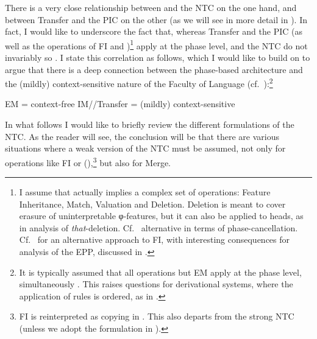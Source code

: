 \documentclass[output=paper]{langsci/langscibook}
\begin{document}
There is a very close relationship between  and the \gls{NTC} on the one hand, and between Transfer and the \gls{PIC} on
the other (as we will see in more detail in ). In fact, I would
like to underscore the fact that, whereas Transfer and the \gls{PIC} (as well
as the operations of \gls{FI} and )\footnote{I assume that
     actually implies a complex set of operations: Feature
    Inheritance, Match, Valuation and Deletion. Deletion is meant to cover
    erasure of uninterpretable φ-features, but it can also be applied to heads,
    as in  analysis of \emph{that}-deletion.
    Cf.~\citet{EKS2016} alternative in terms of phase-cancellation.
Cf.~\citet{Gallego2014} for an alternative approach to \gls{FI}, with
interesting consequences for   analysis of the
\gls{EPP}, discussed in
\citet{Gallego2017}.} apply at the phase level,  and the
\gls{NTC} do not invariably so
\parencites[17]{Chomsky2007}[143]{Chomsky2008}[40, 42]{Chomsky2013}. I state
this correlation as follows, which I would like to build on to argue that there
is a deep connection between the phase-based architecture and the (mildly)
context-sensitive nature of the Faculty of Language
(cf.~\citealt{Chomsky1956,Uriagereka2008}):\footnote{It is typically assumed
    that all operations but \gls{EM} apply at the phase
    level, simultaneously
    \parencites[116]{Chomsky2004}[19]{Chomsky2005}[17]{Chomsky2007}[155]{Chomsky2008}.
This raises questions for derivational systems, where the application of rules
is ordered, as in \citet{Chomsky2015}.}

\ea%
    \label{ex:34.3}
    \ea \gls{EM} = context-free
    \ex {}\gls{IM}\slash {}\slash Transfer = (mildly) context-sensitive
    \z
\z

In what follows I would like to briefly review the different formulations of
the \gls{NTC}. As the reader will see, the conclusion will be that there are
various situations where a weak version of the \gls{NTC} must be assumed, not only for operations like \gls{FI} or
 (\citealt[19, fn.\ 26]{Chomsky2007}),\footnote{\gls{FI} is
    reinterpreted as copying in \citet[47]{Chomsky2013}. This also departs from
    the strong \gls{NTC} (unless we adopt the
formulation in \citealt{Gallego2014}).\label{fn:34.8}} but also for Merge.
\end{document}
